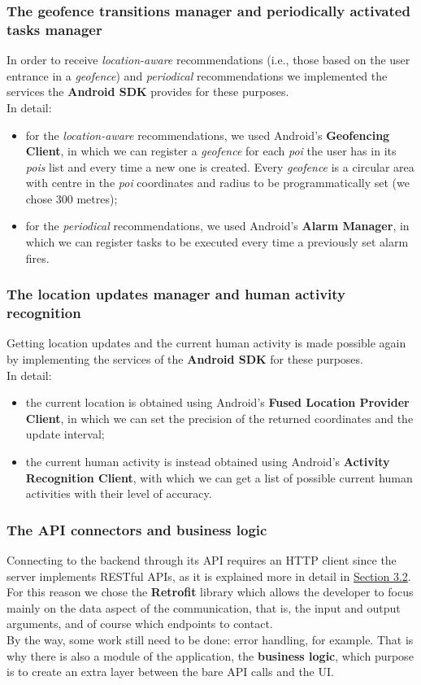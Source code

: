 \documentclass[../../main]{subfiles}
\begin{document}
\subsubsection{The geofence transitions manager and periodically activated tasks manager}
In order to receive \textit{location-aware} recommendations (i.e., those based on the user entrance in a \textit{geofence}) and \textit{periodical} recommendations we implemented the services the \textbf{Android SDK} provides for these purposes.\\
In detail:
\begin{itemize}
    \item for the \textit{location-aware} recommendations, we used Android's \textbf{Geofencing Client}, in which we can register a \textit{geofence} for each \textit{poi} the user has in its \textit{pois} list and every time a new one is created.
    Every \textit{geofence} is a circular area with centre in the \textit{poi} coordinates and radius to be programmatically set (we chose 300 metres);
    \item for the \textit{periodical} recommendations, we used Android's \textbf{Alarm Manager}, in which we can register tasks to be executed every time a previously set alarm fires.
\end{itemize}

\subsubsection{The location updates manager and human activity recognition}
Getting location updates and the current human activity is made possible again by implementing the services of the \textbf{Android SDK} for these purposes.\\
In detail:
\begin{itemize}
    \item the current location is obtained using Android's \textbf{Fused Location Provider Client}, in which we can set the precision of the returned coordinates and the update interval;
    \item the current human activity is instead obtained using Android's \textbf{Activity Recognition Client}, with which we can get a list of possible current human activities with their level of accuracy.
\end{itemize}

\subsubsection{The API connectors and business logic}
Connecting to the backend through its API requires an HTTP client since the server implements RESTful APIs, as it is explained more in detail in \hyperref[ss:server-implementation-choices]{Section 3.2}.
For this reason we chose the \textbf{Retrofit} library which allows the developer to focus mainly on the data aspect of the communication, that is, the input and output arguments, and of course which endpoints to contact.\\
By the way, some work still need to be done: error handling, for example. That is why there is also a module of the application, the \textbf{business logic}, which purpose is to create an extra layer between the bare API calls and the UI.
\end{document}
